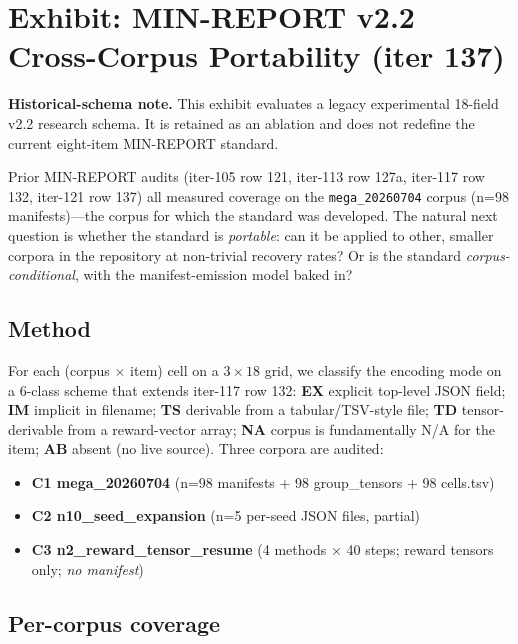 \section{Exhibit: MIN-REPORT v2.2 Cross-Corpus Portability (iter 137)}
\label{sec:p5-iter137-cross-corpus}

\noindent\textbf{Historical-schema note.} This exhibit evaluates a legacy
experimental 18-field v2.2 research schema. It is retained as an ablation and
does not redefine the current eight-item MIN-REPORT standard.

Prior MIN-REPORT audits (iter-105 row 121, iter-113 row 127a, iter-117 row
132, iter-121 row 137) all measured coverage on the
\texttt{mega\_20260704} corpus (n=98 manifests)---the corpus for which
the standard was developed. The natural next question is whether the
standard is \emph{portable}: can it be applied to other, smaller corpora
in the repository at non-trivial recovery rates? Or is the standard
\emph{corpus-conditional}, with the manifest-emission model baked in?

\subsection*{Method}

For each (corpus $\times$ item) cell on a $3 \times 18$ grid, we classify
the encoding mode on a 6-class scheme that extends iter-117 row 132:
\textbf{EX} explicit top-level JSON field; \textbf{IM} implicit in
filename; \textbf{TS} derivable from a tabular/TSV-style file; \textbf{TD}
tensor-derivable from a reward-vector array; \textbf{NA} corpus is
fundamentally N/A for the item; \textbf{AB} absent (no live source).
Three corpora are audited:

\begin{itemize}
  \item \textbf{C1 mega\_20260704} (n=98 manifests + 98 group\_tensors + 98 cells.tsv)
  \item \textbf{C2 n10\_seed\_expansion} (n=5 per-seed JSON files, partial)
  \item \textbf{C3 n2\_reward\_tensor\_resume} (4 methods $\times$ 40 steps; reward tensors only; \emph{no manifest})
\end{itemize}

\subsection*{Per-corpus coverage}

